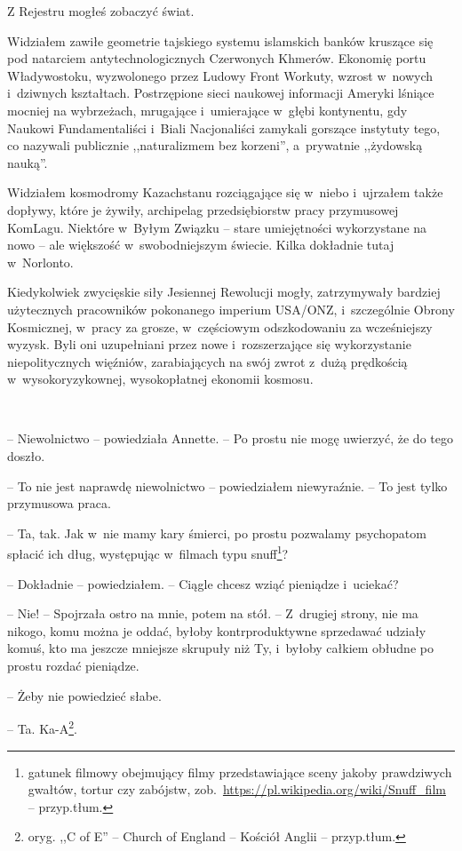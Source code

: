 \documentclass[oneside,polish,11pt,sfheadings]{mwbk}
\begin{document}
Z Rejestru mogłeś zobaczyć świat.

Widziałem zawiłe geometrie tajskiego systemu islamskich banków kruszące
się pod natarciem antytechnologicznych Czerwonych Khmerów. Ekonomię
portu Władywostoku, wyzwolonego przez Ludowy Front Workuty, wzrost w~nowych i~dziwnych kształtach. Postrzępione sieci naukowej informacji
Ameryki lśniące mocniej na wybrzeżach, mrugające i~umierające w~głębi
kontynentu, gdy Naukowi Fundamentaliści i~Biali Nacjonaliści zamykali
gorszące instytuty tego, co nazywali publicznie ,,naturalizmem bez
korzeni'', a~prywatnie ,,żydowską nauką''.

Widziałem kosmodromy Kazachstanu rozciągające się w~niebo i~ujrzałem
także dopływy, które je żywiły, archipelag przedsiębiorstw pracy
przymusowej KomLagu. Niektóre w~Byłym Związku -- stare umiejętności
wykorzystane na nowo -- ale większość w~swobodniejszym świecie. Kilka
dokładnie tutaj w~Norlonto.

Kiedykolwiek zwycięskie siły Jesiennej Rewolucji mogły, zatrzymywały
bardziej użytecznych pracowników pokonanego imperium USA/ONZ, i~szczególnie Obrony Kosmicznej, w~pracy za grosze, w~częściowym
odszkodowaniu za wcześniejszy wyzysk. Byli oni uzupełniani przez nowe i~rozszerzające się wykorzystanie niepolitycznych więźniów, zarabiających
na swój zwrot z~dużą prędkością w~wysokoryzykownej, wysokopłatnej
ekonomii kosmosu.

~

-- Niewolnictwo -- powiedziała Annette. -- Po prostu nie mogę uwierzyć, że
do tego doszło.

-- To nie jest naprawdę niewolnictwo -- powiedziałem niewyraźnie. -- To
jest tylko przymusowa praca.

-- Ta, tak. Jak w~nie mamy kary śmierci, po prostu pozwalamy psychopatom
spłacić ich dług, występując w~filmach typu snuff\footnote{gatunek filmowy
obejmujący filmy przedstawiające sceny jakoby prawdziwych gwałtów,
tortur czy zabójstw,
zob.~\url{https://pl.wikipedia.org/wiki/Snuff_film } -- przyp.tłum.}?
 
-- Dokładnie -- powiedziałem. -- Ciągle chcesz wziąć pieniądze i~uciekać?

-- Nie! -- Spojrzała ostro na mnie, potem na stół. -- Z~drugiej strony, nie
ma nikogo, komu można je oddać, byłoby kontrproduktywne sprzedawać
udziały komuś, kto ma jeszcze mniejsze skrupuły niż Ty, i~byłoby całkiem
obłudne po prostu rozdać pieniądze.

-- Żeby nie powiedzieć słabe.

-- Ta. Ka-A\footnote{oryg. ,,C of E'' -- Church of England -- Kościół Anglii -- przyp.tłum.}. 
\end{document}
